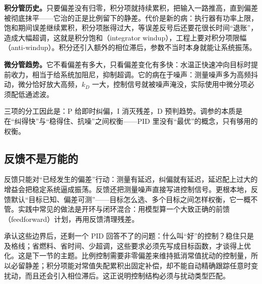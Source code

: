 \textbf{积分管历史。}只要偏差没有归零，积分项就持续累积，把输入一路推高，直到偏差被彻底抹平——它治的正是比例留下的静差。代价是新的病：执行器有功率上限，饱和期间误差继续累积，积分项胀得过大，等误差反号后还要花很长时间``退账''，造成大幅超调，这就是积分饱和（integrator windup），工程上要对积分项限幅（anti-windup）。积分还引入额外的相位滞后，参数不当时本身就能让系统振荡。

\textbf{微分管趋势。}它不看偏差有多大，只看偏差变化有多快：水温正快速冲向目标时提前收力，相当于给系统加阻尼，抑制超调。它的病在于噪声：测量噪声多为高频抖动，微分恰好放大高频，\(k_D\) 一大，控制信号就被噪声淹没，实际使用中微分项必须配低通滤波。

三项的分工因此是：P 给即时纠偏，I 消灭残差，D 预判趋势。调参的本质是在``纠得快''与``稳得住、抗噪''之间权衡——PID 里没有``最优''的概念，只有够用的权衡。

\subsection{反馈不是万能的}

反馈只能对``已经发生的偏差''行动：测量有延迟，纠偏就有延迟，延迟配上过大的增益会把稳定系统逼成振荡。反馈还把测量噪声直接写进控制信号。更根本地，反馈默认``目标已知、偏差可测''——目标怎么选、多个目标之间怎样权衡，它一概不管。实践中常见的做法是开环与闭环混合：用模型算一个大致正确的前馈（feedforward）计划，再用反馈清理残差。

承认这些边界后，还剩一个 PID 回答不了的问题：什么叫``好''的控制？稳住只是及格线；省燃料、省时间、少超调，这些要求必须先写成目标函数，才谈得上优化。这是下一节的主题。比例控制需要非零偏差来维持抵消常值扰动的控制量，所以必留静差；积分项能对常值失配累积出固定补偿，却不能自动精确跟踪任意时变扰动，而且还会引入相位滞后。这正说明控制结构必须与扰动类型匹配。
